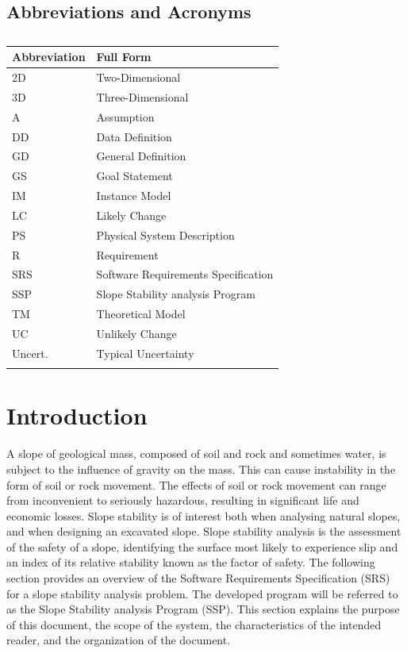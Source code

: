 \documentclass[12pt]{article}
\begin{document}
\subsection{Abbreviations and Acronyms}
\label{Sec:TAbbAcc}
\begin{longtable}{l l}
\toprule
\textbf{Abbreviation} & \textbf{Full Form}
\\
\midrule
\endhead
2D & Two-Dimensional
\\
3D & Three-Dimensional
\\
A & Assumption
\\
DD & Data Definition
\\
GD & General Definition
\\
GS & Goal Statement
\\
IM & Instance Model
\\
LC & Likely Change
\\
PS & Physical System Description
\\
R & Requirement
\\
SRS & Software Requirements Specification
\\
SSP & Slope Stability analysis Program
\\
TM & Theoretical Model
\\
UC & Unlikely Change
\\
Uncert. & Typical Uncertainty
\\
\bottomrule
\caption{}
\label{Table:TAbbAcc}
\end{longtable}
\section{Introduction}
\label{Sec:Intro}
A slope of geological mass, composed of soil and rock and sometimes water, is subject to the influence of gravity on the mass. This can cause instability in the form of soil or rock movement. The effects of soil or rock movement can range from inconvenient to seriously hazardous, resulting in significant life and economic losses. Slope stability is of interest both when analysing natural slopes, and when designing an excavated slope. Slope stability analysis is the assessment of the safety of a slope, identifying the surface most likely to experience slip and an index of its relative stability known as the factor of safety.
The following section provides an overview of the Software Requirements Specification (SRS) for a slope stability analysis problem. The developed program will be referred to as the Slope Stability analysis Program (SSP). This section explains the purpose of this document, the scope of the system, the characteristics of the intended reader, and the organization of the document.
\end{document}
